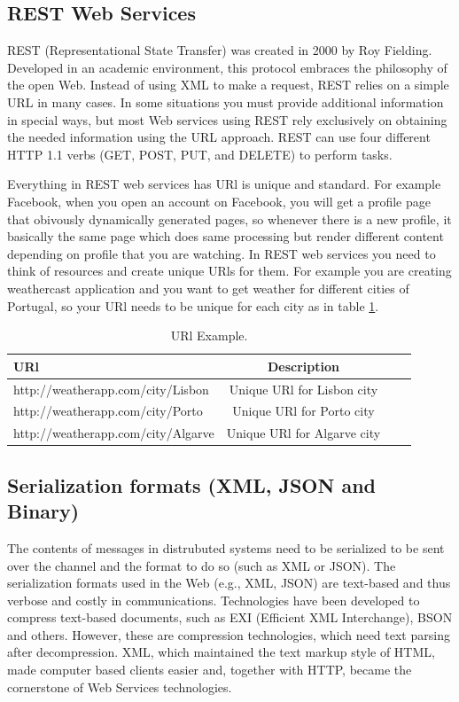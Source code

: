 \documentclass[runningheads,a4paper]{llncs}
\begin{document}
\subsection{REST Web Services}

REST (Representational State Transfer) was created in 2000 by Roy Fielding\cite{state5_1}. Developed in an academic environment, this protocol embraces the philosophy of the open Web. Instead of using XML to make a request, REST relies on a simple URL in many cases. In some situations you must provide additional information in special ways, but most Web services using REST rely exclusively on obtaining the needed information using the URL approach. REST can use four different HTTP 1.1 verbs (GET, POST, PUT, and DELETE) to perform tasks.

Everything in REST web services has URl is unique and standard. For example Facebook, when you open an account on Facebook, you will get a profile page that obivously dynamically generated pages, so whenever there is a new profile, it basically the same page which does same processing but render different content depending on profile that you are watching. In REST web services you need to think of resources and create unique URls for them. For example you are creating weathercast application and you want to get weather for different cities of Portugal, so your URl needs to be unique for each city as in table \ref{tab:urlexample}.

\begin{table}[!htb]
  \renewcommand{\arraystretch}{1.2} %
  \centering
  \begin{tabular}{lccc}
    \toprule
    URl & Description  \\
    \midrule
    http://weatherapp.com/city/Lisbon &  Unique URl for Lisbon city\\
    http://weatherapp.com/city/Porto & Unique URl for Porto city\\
    http://weatherapp.com/city/Algarve & Unique URl for Algarve city\\
    \bottomrule
  \end{tabular}
  \caption[URl Example.]{URl Example.}
  \label{tab:urlexample}
\end{table}
\subsection{Serialization formats (XML, JSON and Binary)}

The contents of messages in distrubuted systems need to be serialized to be sent over the channel and the format to do so (such as XML or JSON). The serialization formats used in the Web (e.g., XML, JSON) are text-based and thus verbose and costly in communications. Technologies have been developed to compress text-based documents\cite{state5_3}, such as EXI (Efficient XML Interchange), BSON and others\cite{state5_4}. However, these are compression technologies, which need text parsing after decompression. XML, which maintained the text markup style of HTML, made computer based clients easier and, together with HTTP, became the cornerstone of Web Services technologies.
\end{document}
